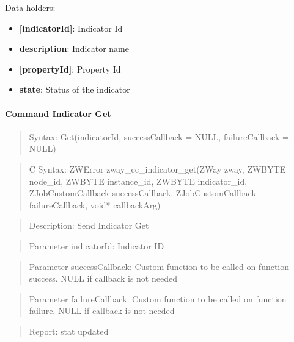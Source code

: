 \noindent
Data holders:

\begin{itemize}
\item \textbf{[indicatorId]}: Indicator Id
\item \qquad\textbf{description}: Indicator name
\item \qquad\textbf{[propertyId]}: Property Id
\item \qquad\qquad\textbf{state}: Status of the indicator
\end{itemize}

\paragraph{Command Indicator Get}
\begin{quote}Syntax: Get(indicatorId, successCallback = NULL, failureCallback = NULL)\end{quote}
\begin{quote}C Syntax: ZWError zway\_cc\_indicator\_get(ZWay zway, ZWBYTE node\_id, ZWBYTE instance\_id, ZWBYTE indicator\_id, ZJobCustomCallback successCallback, ZJobCustomCallback failureCallback, void* callbackArg)\end{quote}
\begin{quote}Description: Send Indicator Get\end{quote}
\begin{quote}Parameter indicatorId: Indicator ID\end{quote}
\begin{quote}Parameter successCallback: Custom function to be called on function success. NULL if callback is not needed\end{quote}
\begin{quote}Parameter failureCallback: Custom function to be called on function failure. NULL if callback is not needed\end{quote}
\begin{quote}Report: stat updated\end{quote}

